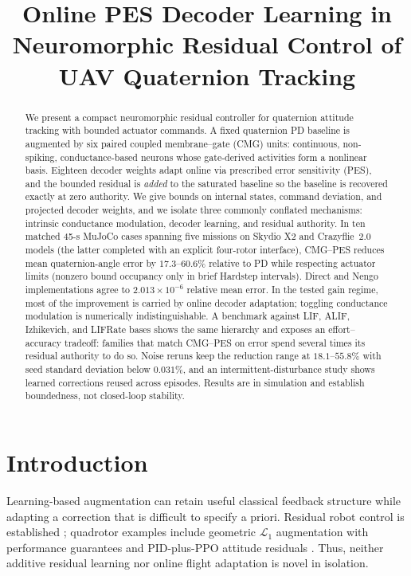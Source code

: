 \documentclass[letterpaper,10pt,conference]{IEEEtran}
\title{Online PES Decoder Learning in Neuromorphic Residual Control of UAV Quaternion Tracking}
\author{%
\IEEEauthorblockN{Gandhi Contreras\IEEEauthorrefmark{1}, Steven Sandoval\IEEEauthorrefmark{1}, Luis Garcia\IEEEauthorrefmark{2}}%
\IEEEauthorblockA{\IEEEauthorrefmark{1}New Mexico State University (NMSU), Las Cruces, NM, USA}%
\IEEEauthorblockA{\IEEEauthorrefmark{2}U.S. Air Force, Los Alamos, NM, USA}%
}
\begin{document}
\maketitle
\thispagestyle{empty}
\pagestyle{empty}

\begin{abstract}
We present a compact neuromorphic residual controller for quaternion attitude
tracking with bounded actuator commands. A fixed quaternion PD baseline is
augmented by six paired coupled membrane--gate (CMG) units: continuous,
non-spiking, conductance-based neurons whose gate-derived activities form a
nonlinear basis. Eighteen decoder
weights adapt online via prescribed error sensitivity (PES), and the bounded
residual is \emph{added} to the saturated baseline so the baseline is recovered
exactly at zero authority. We give bounds on internal states, command
deviation, and projected decoder weights, and we isolate three commonly
conflated mechanisms: intrinsic conductance modulation, decoder learning, and
residual authority.
In ten matched 45-s MuJoCo cases spanning five missions on Skydio X2 and
Crazyflie~2.0 models (the latter completed with an explicit four-rotor
interface), CMG--PES reduces mean quaternion-angle error by $17.3$--$60.6\%$
relative to PD while respecting actuator limits (nonzero bound occupancy only
in brief Hardstep intervals). Direct and Nengo implementations agree to
$2.013\times10^{-6}$ relative mean error. In the tested gain regime, most of
the improvement is carried by online decoder adaptation; toggling conductance
modulation is numerically indistinguishable. A benchmark against LIF, ALIF,
Izhikevich, and LIFRate bases shows the same hierarchy and exposes an
effort--accuracy tradeoff: families that match CMG--PES on error spend
several times its residual authority to do so. Noise reruns keep the reduction
range at $18.1$--$55.8\%$ with seed standard deviation below $0.031\%$, and an
intermittent-disturbance study shows learned corrections reused across
episodes. Results are in simulation and establish boundedness, not closed-loop
stability.
\end{abstract}

\section{Introduction}
Learning-based augmentation can retain useful classical feedback structure
while adapting a correction that is difficult to specify a priori.
Residual robot control is established \cite{johannink2019}; quadrotor
examples include geometric $\mathcal L_1$ augmentation with performance
guarantees \cite{wu2025l1quad} and PID-plus-PPO attitude residuals
\cite{li2027hpappo}. Thus, neither additive residual learning nor online
flight adaptation is novel in isolation.
\end{document}
